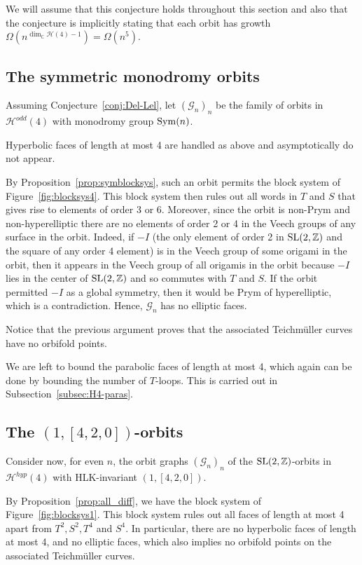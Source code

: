 \documentclass[a4paper,11pt]{amsart}
\numberwithin{equation}{section}
\numberwithin{figure}{section}
\numberwithin{table}{section}
\newcommand{\teichmuller}{Teichm{\"u}ller }
\newcommand{\odd}{\mathcal{H}^{odd}}
\newcommand{\hyp}{\mathcal{H}^{hyp}}
\newcommand{\C}{\mathbb{C}}
\newcommand{\Z}{\mathbb{Z}}
\DeclareMathOperator{\SL}{{\rm{SL}}}
\DeclareMathOperator{\Sym}{{\rm{Sym}}}
\begin{document}
We will assume that this conjecture holds throughout this section and also that the conjecture is implicitly stating that each orbit has growth $\Omega(n^{\dim_\C\mathcal{H}(4)-1}) = \Omega(n^{5})$.

\subsection{The symmetric monodromy orbits}\label{subsec:H4-sym}

Assuming Conjecture~\ref{conj:Del-Lel}, let $(\mathcal{G}_{n})_{n}$ be the family of orbits in $\odd(4)$ with monodromy group $\Sym(n)$.

Hyperbolic faces of length at most 4 are handled as above and asymptotically do not appear.

By Proposition~\ref{prop:symblocksys}, such an orbit permits the block system of Figure~\ref{fig:blocksys4}. This block system then rules out all words in $T$ and $S$ that gives rise to elements of order 3 or 6. Moreover, since the orbit is non-Prym and non-hyperelliptic there are no elements of order 2 or 4 in the Veech groups of any surface in the orbit. Indeed, if $-I$ (the only element of order 2 in $\SL(2,\Z)$ and the square of any order 4 element) is in the Veech group of some origami in the orbit, then it appears in the Veech group of all origamis in the orbit because $-I$ lies in the center of $\SL(2,\Z)$ and so commutes with $T$ and $S$. If the orbit permitted $-I$ as a global symmetry, then it would be Prym of hyperelliptic, which is a contradiction. Hence, $\mathcal{G}_{n}$ has no elliptic faces.

Notice that the previous argument proves that the associated \teichmuller curves have no orbifold points.

We are left to bound the parabolic faces of length at most 4, which again can be done by bounding the number of $T$-loops. This is carried out in Subsection~\ref{subsec:H4-paras}.

\subsection{The $(1,[4,2,0])$-orbits}

Consider now, for even $n$, the orbit graphs $(\mathcal{G}_{n})_n$ of the $\SL(2,\Z)$-orbits in $\hyp(4)$ with HLK-invariant $(1,[4,2,0])$.

By Proposition~\ref{prop:all_diff}, we have the block system of Figure~\ref{fig:blocksys1}. This block system rules out all faces of length at most 4 apart from $T^2,S^2, T^4$ and $S^4$. In particular, there are no hyperbolic faces of length at most 4, and no elliptic faces, which also implies no orbifold points on the associated \teichmuller curves.
\end{document}
